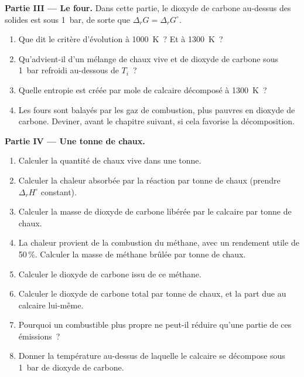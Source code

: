 \begin{problem}
\medskip
\noindent\textbf{Partie III --- Le four.}
Dans cette partie, le dioxyde de carbone au-dessus des solides est sous \qty{1}{bar}, de sorte
que $\Delta_r G = \Delta_r G^\circ$.
\begin{enumerate}[resume]
  \item Que dit le critère d'évolution à \qty{1000}{K}~? Et à
        \qty{1300}{K}~?
  \item Qu'advient-il d'un mélange de chaux vive et de dioxyde de carbone sous
        \qty{1}{bar} refroidi au-dessous de $T_i$~?
  \item Quelle entropie est créée par mole de calcaire décomposé à
        \qty{1300}{K}~?
  \item Les fours sont balayés par les gaz de combustion, plus pauvres en dioxyde de carbone.
        Deviner, avant le chapitre suivant, si cela favorise la
        décomposition.
\end{enumerate}

\medskip
\noindent\textbf{Partie IV --- Une tonne de chaux.}
\begin{enumerate}[resume]
  \item Calculer la quantité de chaux vive dans une tonne.
  \item Calculer la chaleur absorbée par la réaction par tonne de chaux
        (prendre $\Delta_r H^\circ$ constant).
  \item Calculer la masse de dioxyde de carbone libérée par le calcaire par
        tonne de chaux.
  \item La chaleur provient de la combustion du méthane, avec un rendement utile de
        50\,\%. Calculer la masse de méthane brûlée par tonne de chaux.
  \item Calculer le dioxyde de carbone issu de ce méthane.
  \item Calculer le dioxyde de carbone total par tonne de chaux, et la part
        due au calcaire lui-même.
  \item Pourquoi un combustible plus propre ne peut-il réduire qu'une partie de ces émissions~?
  \item Donner la température au-dessus de laquelle le calcaire se décompose sous
        \qty{1}{bar} de dioxyde de carbone.
\end{enumerate}
\end{problem}
